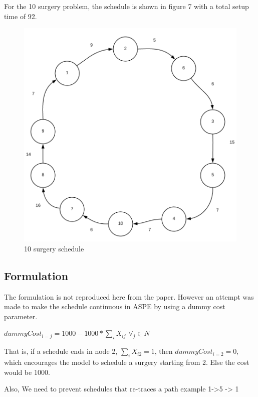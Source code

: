 \documentclass[]{article}
\begin{document}
For the 10 surgery problem, the schedule is shown in figure 7 with a
total setup time of 92.

\begin{figure}[h]

{\centering \includegraphics[width=6.08in]{Figures/Homework3/p3bS} 

}

\caption{10 surgery schedule}\label{fig:unnamed-chunk-7}
\end{figure}

\subsection{Formulation}\label{formulation-2}

The formulation is not reproduced here from the paper. However an
attempt was made to make the schedule continuous in ASPE by using a
dummy cost parameter.

\(dummyCost_{i=j} = 1000 - 1000* \sum_{i}X_{ij}\) \(\forall_{j} \in N\)

That is, if a schedule ends in node 2, \(\sum_{i}X_{i2} = 1\), then
\(dummyCost_{i=2} = 0\), which encourages the model to schedule a
surgery starting from 2. Else the cost would be 1000.

Also, We need to prevent schedules that re-traces a path example
1-\textgreater{}5 -\textgreater{} 1
\end{document}
